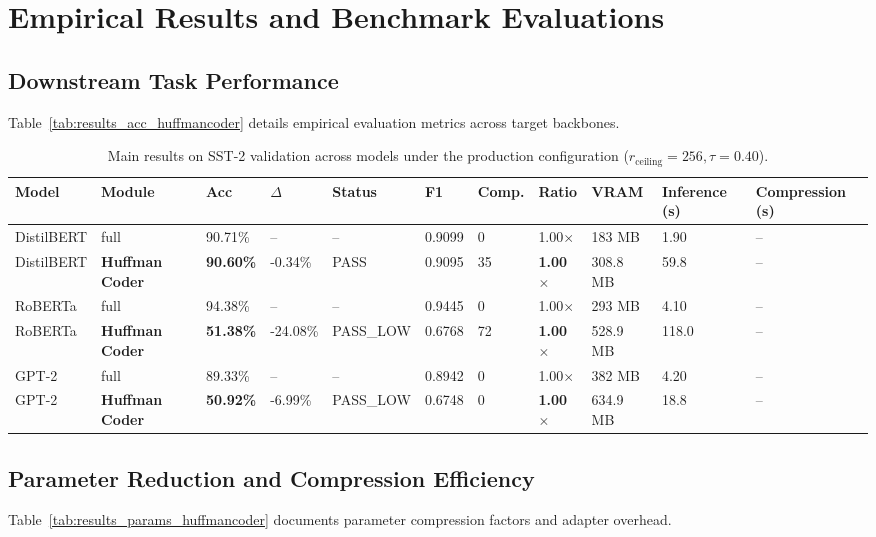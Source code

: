 \section{Empirical Results and Benchmark Evaluations}

\subsection{Downstream Task Performance}
Table~\ref{tab:results_acc_huffmancoder} details empirical evaluation metrics across target backbones.

\begin{table}[t]
\centering
\small
\begin{tabular}{lllllllllll}
\toprule
\textbf{Model} & \textbf{Module} & \textbf{Acc} & \textbf{$\Delta$} & \textbf{Status} & \textbf{F1} & \textbf{Comp.} & \textbf{Ratio} & \textbf{VRAM} & \textbf{Inference (s)} & \textbf{Compression (s)} \\
\midrule
DistilBERT & full & 90.71\% & -- & -- & 0.9099 & 0 & 1.00$\times$ & 183 MB & 1.90 & -- \\
DistilBERT & \textbf{Huffman Coder} & \textbf{90.60\%} & -0.34\% & PASS & 0.9095 & 35 & \textbf{1.00$\times$} & 308.8 MB & 59.8 & -- \\
RoBERTa & full & 94.38\% & -- & -- & 0.9445 & 0 & 1.00$\times$ & 293 MB & 4.10 & -- \\
RoBERTa & \textbf{Huffman Coder} & \textbf{51.38\%} & -24.08\% & PASS\_LOW & 0.6768 & 72 & \textbf{1.00$\times$} & 528.9 MB & 118.0 & -- \\
GPT-2 & full & 89.33\% & -- & -- & 0.8942 & 0 & 1.00$\times$ & 382 MB & 4.20 & -- \\
GPT-2 & \textbf{Huffman Coder} & \textbf{50.92\%} & -6.99\% & PASS\_LOW & 0.6748 & 0 & \textbf{1.00$\times$} & 634.9 MB & 18.8 & -- \\
\bottomrule
\end{tabular}
\caption{Main results on SST-2 validation across models under the production configuration ($r_{\mathrm{ceiling}}=256, \tau=0.40$).}
\label{tab:main_sst2}
\end{table}

\subsection{Parameter Reduction and Compression Efficiency}
Table~\ref{tab:results_params_huffmancoder} documents parameter compression factors and adapter overhead.

